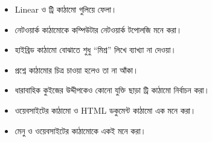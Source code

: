 \par\noindent
\begin{minipage}[t]{.48\linewidth}\vspace{0pt}
\begin{itemize}
\item Linear ও ট্রি কাঠামো গুলিয়ে ফেলা।
\item নেটওয়ার্ক কাঠামোকে কম্পিউটার নেটওয়ার্ক টপোলজি মনে করা।
\item হাইব্রিড কাঠামো বোঝাতে শুধু ``মিশ্র'' লিখে ব্যাখ্যা না দেওয়া।
\item প্রশ্নে কাঠামোর চিত্র চাওয়া হলেও তা না আঁকা।
\end{itemize}
\end{minipage}\hfill
\begin{minipage}[t]{.48\linewidth}\vspace{0pt}
\begin{itemize}
\item ধারাবাহিক কুইজের উদ্দীপকেও কোনো যুক্তি ছাড়া ট্রি কাঠামো নির্বাচন করা।
\item ওয়েবসাইটের কাঠামো ও HTML ডকুমেন্ট কাঠামো এক মনে করা।
\item মেনু ও ওয়েবসাইটের কাঠামোকে একই মনে করা।
\end{itemize}
\end{minipage}\par


